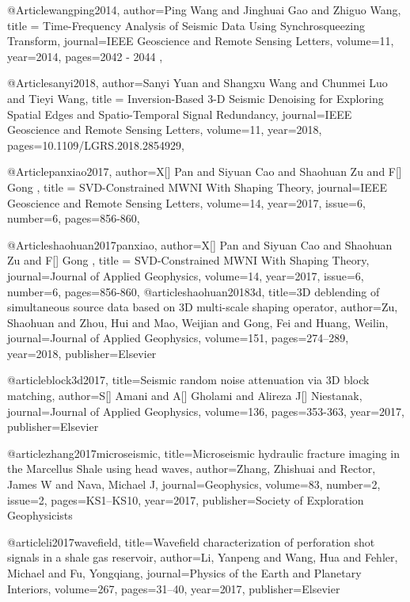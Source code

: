 @Article{wangping2014,
  author={Ping Wang and Jinghuai Gao and Zhiguo Wang},
  title = {Time-Frequency Analysis of Seismic Data Using Synchrosqueezing Transform},
  journal={IEEE Geoscience and Remote Sensing Letters},
  volume={11},
  year=2014,
  pages={2042 - 2044 },
}

@Article{sanyi2018,
  author={Sanyi Yuan and Shangxu Wang and Chunmei Luo and Tieyi Wang},
  title = {Inversion-Based 3-D Seismic Denoising for Exploring Spatial Edges and Spatio-Temporal Signal Redundancy},
  journal={IEEE Geoscience and Remote Sensing Letters},
  volume={11},
  year=2018,
  pages={10.1109/LGRS.2018.2854929},
}



@Article{panxiao2017,
  author={X[] Pan and Siyuan Cao and Shaohuan Zu and F[] Gong },
  title = {SVD-Constrained MWNI With Shaping Theory},
  journal={IEEE Geoscience and Remote Sensing Letters},
  volume={14},
  year=2017,
  issue=6,
  number=6,
  pages={856-860},
}

@Article{shaohuan2017panxiao,
  author={X[] Pan and Siyuan Cao and Shaohuan Zu and F[] Gong },
  title = {SVD-Constrained MWNI With Shaping Theory},
  journal={Journal of Applied Geophysics},
  volume={14},
  year=2017,
  issue=6,
  number=6,
  pages={856-860},
}
@article{shaohuan20183d,
  title={3{D} deblending of simultaneous source data based on 3{D} multi-scale shaping operator},
  author={Zu, Shaohuan and Zhou, Hui and Mao, Weijian and Gong, Fei and Huang, Weilin},
  journal={Journal of Applied Geophysics},
  volume={151},
  pages={274--289},
  year={2018},
  publisher={Elsevier}
}

@article{block3d2017,
  title={Seismic random noise attenuation via 3{D} block matching},
  author={S[] Amani and A[] Gholami and Alireza J[] Niestanak},
  journal={Journal of Applied Geophysics},
  volume={136},
  pages={353-363},
  year={2017},
  publisher={Elsevier}
}

@article{zhang2017microseismic,
  title={Microseismic hydraulic fracture imaging in the {M}arcellus {S}hale using head waves},
  author={Zhang, Zhishuai and Rector, James W and Nava, Michael J},
  journal={Geophysics},
  volume={83},
  number={2},
  issue=2,
  pages={KS1--KS10},
  year={2017},
  publisher={Society of Exploration Geophysicists}
}


@article{li2017wavefield,
  title={Wavefield characterization of perforation shot signals in a shale gas reservoir},
  author={Li, Yanpeng and Wang, Hua and Fehler, Michael and Fu, Yongqiang},
  journal={Physics of the Earth and Planetary Interiors},
  volume={267},
  pages={31--40},
  year={2017},
  publisher={Elsevier}
}


